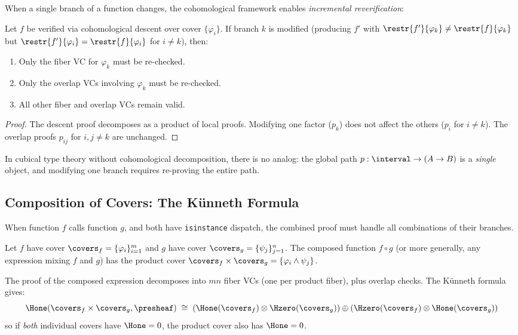 When a single branch of a function changes, the cohomological
framework enables \emph{incremental reverification}:

\begin{proposition}
\label{prop:incremental}
Let $f$ be verified via cohomological descent over cover
$\{\varphi_i\}$.  If branch $k$ is modified (producing $f'$
with $\restr{f'}{\varphi_k} \neq \restr{f}{\varphi_k}$ but
$\restr{f'}{\varphi_i} = \restr{f}{\varphi_i}$ for $i \neq k$),
then:
\begin{enumerate}
\item Only the fiber VC for $\varphi_k$ must be re-checked.
\item Only the overlap VCs involving $\varphi_k$ must be re-checked.
\item All other fiber and overlap VCs remain valid.
\end{enumerate}
\end{proposition}

\begin{proof}
The descent proof decomposes as a product of local proofs.
Modifying one factor ($p_k$) does not affect the others
($p_i$ for $i \neq k$).  The overlap proofs
$p_{ij}$ for $i,j \neq k$ are unchanged.
\end{proof}

In cubical type theory without cohomological decomposition, there
is no analog: the global path $p : \interval \to (A \to B)$ is a
\emph{single} object, and modifying one branch requires re-proving
the entire path.


\subsection{Composition of Covers: The K\"unneth Formula}
\label{sec:kunneth}

When function $f$ calls function $g$, and both have
\texttt{isinstance} dispatch, the combined proof must handle
all combinations of their branches.

\begin{proposition}
\label{prop:compositional}
Let $f$ have cover $\covers_f = \{\varphi_i\}_{i=1}^m$ and
$g$ have cover $\covers_g = \{\psi_j\}_{j=1}^n$.  The
composed function $f \circ g$ (or more generally, any expression
mixing $f$ and $g$) has the product cover
$\covers_f \times \covers_g = \{\varphi_i \wedge \psi_j\}$.

The proof of the composed expression decomposes into $mn$ fiber
VCs (one per product fiber), plus overlap checks.  The K\"unneth
formula gives:
\[
  \Hone(\covers_f \times \covers_g, \presheaf) \;\cong\;
  (\Hone(\covers_f) \otimes \Hzero(\covers_g)) \oplus
  (\Hzero(\covers_f) \otimes \Hone(\covers_g))
\]
so if \emph{both} individual covers have $\Hone = 0$, the
product cover also has $\Hone = 0$.
\end{proposition}

